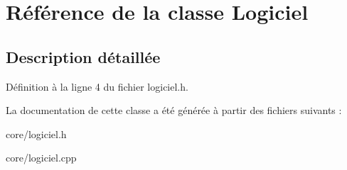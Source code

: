 \hypertarget{class_logiciel}{
\section{Référence de la classe Logiciel}
\label{db/d9f/class_logiciel}
}


\subsection{Description détaillée}


Définition à la ligne 4 du fichier logiciel.h.



La documentation de cette classe a été générée à partir des fichiers suivants :\begin{DoxyCompactItemize}
\item 
core/logiciel.h\item 
core/logiciel.cpp\end{DoxyCompactItemize}
